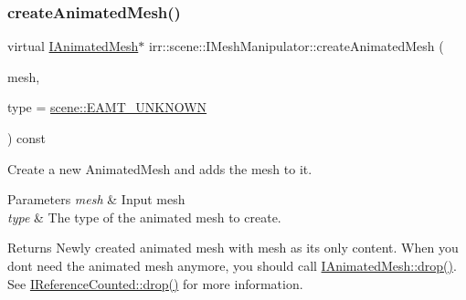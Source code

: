 \subsubsection{\texorpdfstring{create\+Animated\+Mesh()}{createAnimatedMesh()}\hspace{0.1cm}{\footnotesize\ttfamily [2/2]}}
{\footnotesize\ttfamily virtual \hyperlink{classirr_1_1scene_1_1IAnimatedMesh}{I\+Animated\+Mesh}$\ast$ irr\+::scene\+::\+I\+Mesh\+Manipulator\+::create\+Animated\+Mesh (\begin{DoxyParamCaption}\item[{\hyperlink{classirr_1_1scene_1_1IMesh}{I\+Mesh} $\ast$}]{mesh,  }\item[{\hyperlink{namespaceirr_1_1scene_a2fc85a64604521ca063f1881b5dd1c61}{scene\+::\+E\+\_\+\+A\+N\+I\+M\+A\+T\+E\+D\+\_\+\+M\+E\+S\+H\+\_\+\+T\+Y\+PE}}]{type = {\ttfamily \hyperlink{namespaceirr_1_1scene_a2fc85a64604521ca063f1881b5dd1c61a2db2999504900cad42b9295f4198434f}{scene\+::\+E\+A\+M\+T\+\_\+\+U\+N\+K\+N\+O\+WN}} }\end{DoxyParamCaption}) const\hspace{0.3cm}{\ttfamily [pure virtual]}}



Create a new Animated\+Mesh and adds the mesh to it. 


\begin{DoxyParams}{Parameters}
{\em mesh} & Input mesh \\
\hline
{\em type} & The type of the animated mesh to create. \\
\hline
\end{DoxyParams}
\begin{DoxyReturn}{Returns}
Newly created animated mesh with mesh as its only content. When you don\textquotesingle{}t need the animated mesh anymore, you should call \hyperlink{classirr_1_1IReferenceCounted_a03856a09355b89d178090c4a5f738543}{I\+Animated\+Mesh\+::drop()}. See \hyperlink{classirr_1_1IReferenceCounted_a03856a09355b89d178090c4a5f738543}{I\+Reference\+Counted\+::drop()} for more information. 
\end{DoxyReturn}
\mbox{\label{classirr_1_1scene_1_1IMeshManipulator_a5003ca5eabee96fe1c871bdb25ae43fd}} 
